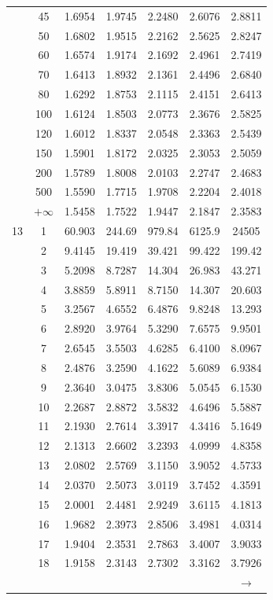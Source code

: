 \begin{minipage}{0.49\textwidth}
\begin{center}
\begin{tabular}{ccccccc}
			& 45 & 1.6954 & 1.9745 & 2.2480 & 2.6076 & 2.8811 \\[5pt]
			& 50 & 1.6802 & 1.9515 & 2.2162 & 2.5625 & 2.8247 \\
			& 60 & 1.6574 & 1.9174 & 2.1692 & 2.4961 & 2.7419 \\
			& 70 & 1.6413 & 1.8932 & 2.1361 & 2.4496 & 2.6840 \\
			& 80 & 1.6292 & 1.8753 & 2.1115 & 2.4151 & 2.6413 \\
			& 100 & 1.6124 & 1.8503 & 2.0773 & 2.3676 & 2.5825 \\
			& 120 & 1.6012 & 1.8337 & 2.0548 & 2.3363 & 2.5439 \\
			& 150 & 1.5901 & 1.8172 & 2.0325 & 2.3053 & 2.5059 \\
			& 200 & 1.5789 & 1.8008 & 2.0103 & 2.2747 & 2.4683 \\
			& 500 & 1.5590 & 1.7715 & 1.9708 & 2.2204 & 2.4018 \\
			& $+\infty$ & 1.5458 & 1.7522 & 1.9447 & 2.1847 & 2.3583 \\
			\midrule
			13 & 1 & 60.903 & 244.69 & 979.84 & 6125.9 & 24505 \\
			& 2 & 9.4145 & 19.419 & 39.421 & 99.422 & 199.42 \\
			& 3 & 5.2098 & 8.7287 & 14.304 & 26.983 & 43.271 \\
			& 4 & 3.8859 & 5.8911 & 8.7150 & 14.307 & 20.603 \\
			& 5 & 3.2567 & 4.6552 & 6.4876 & 9.8248 & 13.293 \\
			& 6 & 2.8920 & 3.9764 & 5.3290 & 7.6575 & 9.9501 \\
			& 7 & 2.6545 & 3.5503 & 4.6285 & 6.4100 & 8.0967 \\
			& 8 & 2.4876 & 3.2590 & 4.1622 & 5.6089 & 6.9384 \\
			& 9 & 2.3640 & 3.0475 & 3.8306 & 5.0545 & 6.1530 \\[5pt]
			& 10 & 2.2687 & 2.8872 & 3.5832 & 4.6496 & 5.5887 \\
			& 11 & 2.1930 & 2.7614 & 3.3917 & 4.3416 & 5.1649 \\
			& 12 & 2.1313 & 2.6602 & 3.2393 & 4.0999 & 4.8358 \\
			& 13 & 2.0802 & 2.5769 & 3.1150 & 3.9052 & 4.5733 \\
			& 14 & 2.0370 & 2.5073 & 3.0119 & 3.7452 & 4.3591 \\
			& 15 & 2.0001 & 2.4481 & 2.9249 & 3.6115 & 4.1813 \\
			& 16 & 1.9682 & 2.3973 & 2.8506 & 3.4981 & 4.0314 \\
			& 17 & 1.9404 & 2.3531 & 2.7863 & 3.4007 & 3.9033 \\
			& 18 & 1.9158 & 2.3143 & 2.7302 & 3.3162 & 3.7926 \\
			&  &  &  &  &  & $\rightarrow$ \\
		\end{tabular}
	\end{center}
\end{minipage}

